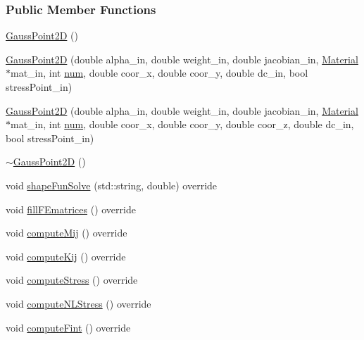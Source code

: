 \subsubsection*{Public Member Functions}
\begin{DoxyCompactItemize}
\item 
\hyperlink{classmknix_1_1_gauss_point2_d_ab5c76c096bb2adf9e5ae547ec2986ce1}{Gauss\+Point2\+D} ()
\item 
\hyperlink{classmknix_1_1_gauss_point2_d_ae3b32462ccbd3016c4f4f9b981a2fa77}{Gauss\+Point2\+D} (double alpha\+\_\+in, double weight\+\_\+in, double jacobian\+\_\+in, \hyperlink{classmknix_1_1_material}{Material} $\ast$mat\+\_\+in, int \hyperlink{classmknix_1_1_gauss_point_a47cb3d74f927e150168f2052553cbea8}{num}, double coor\+\_\+x, double coor\+\_\+y, double dc\+\_\+in, bool stress\+Point\+\_\+in)
\item 
\hyperlink{classmknix_1_1_gauss_point2_d_a12f348c0c41258bc381a42798f3a3c11}{Gauss\+Point2\+D} (double alpha\+\_\+in, double weight\+\_\+in, double jacobian\+\_\+in, \hyperlink{classmknix_1_1_material}{Material} $\ast$mat\+\_\+in, int \hyperlink{classmknix_1_1_gauss_point_a47cb3d74f927e150168f2052553cbea8}{num}, double coor\+\_\+x, double coor\+\_\+y, double coor\+\_\+z, double dc\+\_\+in, bool stress\+Point\+\_\+in)
\item 
\hyperlink{classmknix_1_1_gauss_point2_d_a0aceaa20766b6ea692cba47931f46343}{$\sim$\+Gauss\+Point2\+D} ()
\item 
void \hyperlink{classmknix_1_1_gauss_point2_d_abca54057afb35ce0c15a717464939441}{shape\+Fun\+Solve} (std\+::string, double) override
\item 
void \hyperlink{classmknix_1_1_gauss_point2_d_a52fdfb47648fffcd29d747556572ce06}{fill\+F\+Ematrices} () override
\item 
void \hyperlink{classmknix_1_1_gauss_point2_d_a22dc79e625ce24de6e48ccad0aafd5e3}{compute\+Mij} () override
\item 
void \hyperlink{classmknix_1_1_gauss_point2_d_a42ca0ecb4a8d01315da3992b7a596250}{compute\+Kij} () override
\item 
void \hyperlink{classmknix_1_1_gauss_point2_d_a83cd389403d0293f1e634b40195db230}{compute\+Stress} () override
\item 
void \hyperlink{classmknix_1_1_gauss_point2_d_a4801f7753a3d95517f4161942b53a827}{compute\+N\+L\+Stress} () override
\item 
void \hyperlink{classmknix_1_1_gauss_point2_d_a11a49bfbf496768d12d61f8c6de69a33}{compute\+Fint} () override

\end{DoxyCompactItemize}
